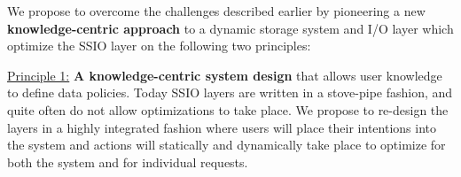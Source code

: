 
%
%
%

We propose to overcome the challenges described earlier by pioneering a new {\bf
knowledge-centric approach} to a dynamic storage system and I/O layer which
optimize the SSIO layer on the following two principles:

\underline{Principle 1:} {\bf A knowledge-centric system design} that allows user knowledge  to
define data policies. Today SSIO layers are written in a
stove-pipe fashion, and quite often do not allow optimizations to take place.
We propose to re-design the layers in a highly integrated fashion where users
will place their intentions into the system and actions will statically and dynamically
take place to optimize for both the system and for individual
requests.

